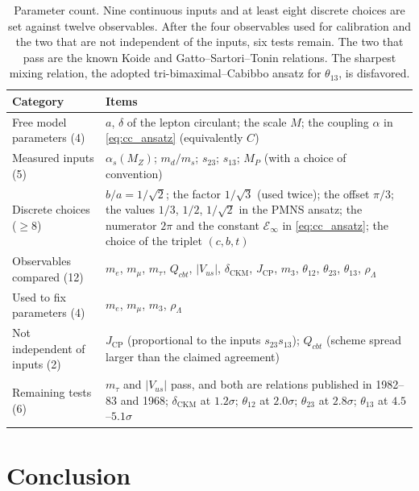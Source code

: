 \documentclass[11pt,reqno]{amsart}
\theoremstyle{definition}
\begin{document}
\begin{table}[htbp]
\centering
\small
\begin{tabular}{@{}L{5.2cm}L{9.8cm}@{}}
\toprule
\textbf{Category} & \textbf{Items} \\
\midrule
Free model parameters (4) & $a$, $\delta$ of the lepton circulant; the scale $M$; the coupling $\alpha$ in \eqref{eq:cc_ansatz} (equivalently $C$) \\
Measured inputs (5) & $\alpha_s(M_Z)$; $m_d/m_s$; $s_{23}$; $s_{13}$; $M_P$ (with a choice of convention) \\
Discrete choices ($\ge 8$) & $b/a = 1/\sqrt2$; the factor $1/\sqrt3$ (used twice); the offset $\pi/3$; the values $1/3$, $1/2$, $1/\sqrt2$ in the PMNS ansatz; the numerator $2\pi$ and the constant $\mathcal{E}_\infty$ in \eqref{eq:cc_ansatz}; the choice of the triplet $(c,b,t)$ \\
\midrule
Observables compared (12) & $m_e$, $m_\mu$, $m_\tau$, $Q_{cbt}$, $|V_{us}|$, $\delta_{\mathrm{CKM}}$, $J_{\mathrm{CP}}$, $m_3$, $\theta_{12}$, $\theta_{23}$, $\theta_{13}$, $\rho_\Lambda$ \\
Used to fix parameters (4) & $m_e$, $m_\mu$, $m_3$, $\rho_\Lambda$ \\
Not independent of inputs (2) & $J_{\mathrm{CP}}$ (proportional to the inputs $s_{23}s_{13}$); $Q_{cbt}$ (scheme spread larger than the claimed agreement) \\
Remaining tests (6) & $m_\tau$ and $|V_{us}|$ pass, and both are relations published in 1982--83 and 1968; $\delta_{\mathrm{CKM}}$ at $1.2\sigma$; $\theta_{12}$ at $2.0\sigma$; $\theta_{23}$ at $2.8\sigma$; $\theta_{13}$ at $4.5$--$5.1\sigma$ \\
\bottomrule
\end{tabular}
\caption{Parameter count. Nine continuous inputs and at least eight discrete choices are set against twelve observables. After the four observables used for calibration and the two that are not independent of the inputs, six tests remain. The two that pass are the known Koide and Gatto--Sartori--Tonin relations. The sharpest mixing relation, the adopted tri-bimaximal--Cabibbo ansatz for $\theta_{13}$, is disfavored.}
\label{tab:count}
\end{table}

\section{Conclusion}
\end{document}
